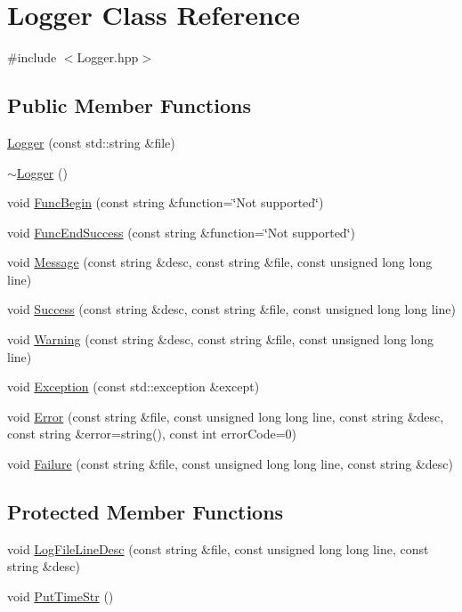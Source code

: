 \hypertarget{class_logger}{\section{Logger Class Reference}
\label{class_logger}
}


{\ttfamily \#include $<$Logger.\-hpp$>$}

\subsection*{Public Member Functions}
\begin{DoxyCompactItemize}
\item 
\hyperlink{class_logger_a0a05ff69f854770ba73be8da23087c6f}{Logger} (const std\-::string \&file)
\item 
\hyperlink{class_logger_acb668a9e186a25fbaad2e4af6d1ed00a}{$\sim$\-Logger} ()
\item 
void \hyperlink{class_logger_a869a3da0fbc98ea124c8142441ba9979}{Func\-Begin} (const string \&function=\char`\"{}Not supported\char`\"{})
\item 
void \hyperlink{class_logger_af6534aa3be0f75da9476bdf98b0cd6bf}{Func\-End\-Success} (const string \&function=\char`\"{}Not supported\char`\"{})
\item 
void \hyperlink{class_logger_a0c51ea7dd128afa466379dee45487377}{Message} (const string \&desc, const string \&file, const unsigned long long line)
\item 
void \hyperlink{class_logger_a61d131fd8e6096c8711e5b05efe15761}{Success} (const string \&desc, const string \&file, const unsigned long long line)
\item 
void \hyperlink{class_logger_afc4de5bbb2fb2b647f0dc86cafc037cf}{Warning} (const string \&desc, const string \&file, const unsigned long long line)
\item 
void \hyperlink{class_logger_a60d34309f66f5ce02675bbdaca545094}{Exception} (const std\-::exception \&except)
\item 
void \hyperlink{class_logger_a7e67b48e4e24f6f2fb03ff40bbeeb9ad}{Error} (const string \&file, const unsigned long long line, const string \&desc, const string \&error=string(), const int error\-Code=0)
\item 
void \hyperlink{class_logger_aa7909a3a0a254c2e90abc09911ba9a20}{Failure} (const string \&file, const unsigned long long line, const string \&desc)
\end{DoxyCompactItemize}
\subsection*{Protected Member Functions}
\begin{DoxyCompactItemize}
\item 
void \hyperlink{class_logger_a6360e51a7be091da6419667be9baaf4d}{Log\-File\-Line\-Desc} (const string \&file, const unsigned long long line, const string \&desc)
\item 
void \hyperlink{class_logger_aa93d938b1a593173396d677f34dfbb1c}{Put\-Time\-Str} ()
\end{DoxyCompactItemize}
